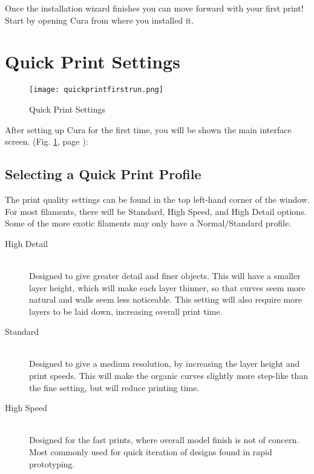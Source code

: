 Once the installation wizard finishes you can move forward with your first print! Start by opening Cura from where you installed it.


\section{Quick Print Settings}
\begin{figure}[H]
\centering
\texttt{[image: quickprintfirstrun.png]}
\caption{Quick Print Settings}
\label{fig:Cura}
\end{figure} 
After setting up Cura for the first time, you will be shown the main interface screen. (Fig. \ref{fig:Cura}, page \pageref{fig:Cura}): 

\subsection{Selecting a Quick Print Profile}
The print quality settings can be found in the top left-hand corner of the window. For most filaments, there will be Standard, High Speed, and High Detail options. Some of the more exotic filaments may only have a Normal/Standard profile.

\begin{description}
\item[High Detail] \hfill \\
Designed to give greater detail and finer objects. This will have a smaller layer height, which will make each layer thinner, so that curves seem more natural and walls seem less noticeable. This setting will also require more layers to be laid down, increasing overall print time.

\item[Standard] \hfill \\
Designed to give a medium resolution, by increasing the layer height and print speeds. This will make the organic curves slightly more step-like than the fine setting, but will reduce printing time.

\item[High Speed] \hfill \\
Designed for the fast prints, where overall model finish is not of concern. Most commonly used for quick iteration of designs found in rapid prototyping.
\end{description}

